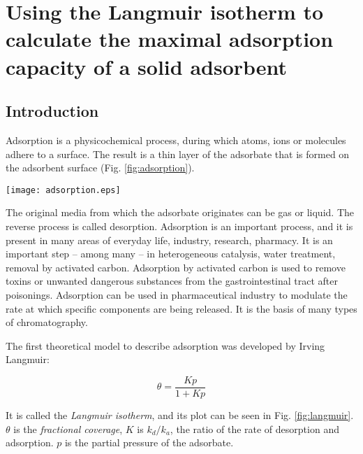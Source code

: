 \fancyhead[LO,RE]{\thesection}
\fancyfoot[LE,RO]{\thepage}

\section{Using the Langmuir isotherm to calculate the maximal adsorption capacity of a solid adsorbent}
\subsection{Introduction}

Adsorption is a physicochemical process, during which atoms, ions or molecules adhere to a surface.
The result is a thin layer of the adsorbate that is formed on the adsorbent surface (Fig. \ref{fig:adsorption}).
\begin{SCfigure}[][b]
\centering
\texttt{[image: adsorption.eps]}
\caption{During adsorption, a thin adhered layer of the adsorbate is produced on the surface of the adsorbent.}
\label{fig:adsorption}
\end{SCfigure}
The original media from which the adsorbate originates can be gas or liquid.
The reverse process is called desorption.
Adsorption is an important process, and it is present in many areas of everyday life, industry, research, pharmacy.
It is an important step -- among many -- in heterogeneous catalysis, water treatment, removal by activated carbon.
Adsorption by activated carbon is used to remove toxins or unwanted dangerous substances from the gastrointestinal tract after poisonings.
Adsorption can be used in pharmaceutical industry to modulate the rate at which specific components are being released. 
It is the basis of many types of chromatography.

The first theoretical model to describe adsorption was developed by Irving Langmuir:

\begin{equation}
\label{eq:langmuir1}
        \theta
        =
        \frac
                {K p}
                {1 + K p} 
\end{equation}

It is called the \emph{Langmuir isotherm}, and its plot can be seen in Fig. \ref{fig:langmuir}. $\theta$ is the \emph{fractional coverage}, $K$ is $k_d/k_a$, the ratio of the rate of desorption and adsorption. $p$ is the partial pressure of the adsorbate.

